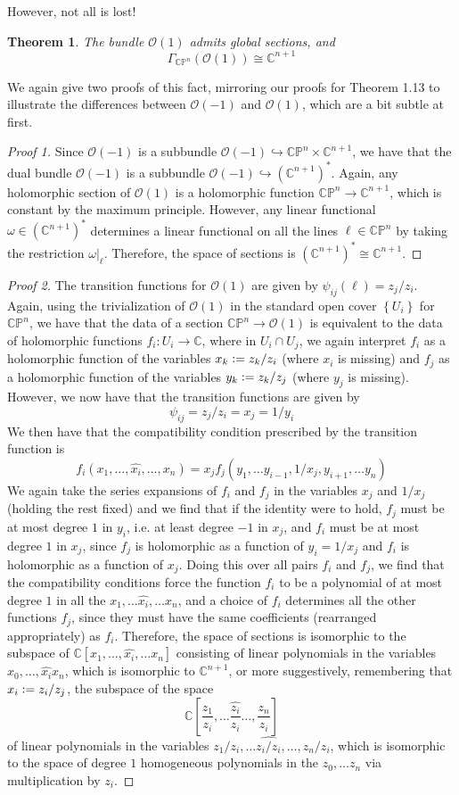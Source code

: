 \documentclass[psamsfonts, 12pt]{amsart}
\newtheorem{thm}{Theorem}[section]
\theoremstyle{definition}
\theoremstyle{remark}
\renewcommand{\O}{\mathscr{O}}
\newcommand{\C}{\mathbb{C}}
\newcommand{\CP}{\mathbb{CP}}
\newcommand{\set}[1]{\left\lbrace #1 \right\rbrace}
\newcommand{\defeq}{\vcentcolon=}
\begin{document}
%
However, not all is lost!
%
\begin{thm}
The bundle $\O(1)$ admits global sections, and
\[
\Gamma_{\CP^n}(\O(1)) \cong \C^{n+1}
\]
\end{thm}
%
We again give two proofs of this fact, mirroring our proofs for Theorem 1.13 to
illustrate the differences between $\O(-1)$ and $\O(1)$, which are a bit subtle at
first.
%
\begin{proof}[Proof 1]
Since $\O(-1)$ is a subbundle $\O(-1) \hookrightarrow \CP^n \times \C^{n+1}$, we
have that the dual bundle $\O(-1)$ is a subbundle $\O(-1) \hookrightarrow (\C^{n+1})^*$.
Again, any holomorphic section of $\O(1)$ is a holomorphic function
$\CP^n \to \C^{n+1}$, which is constant by the maximum principle. However, any
linear functional $\omega \in (\C^{n+1})^*$ determines a linear functional on
all the lines $\ell \in \CP^n$ by taking the restriction $\omega|_\ell$. Therefore,
the space of sections is $(\C^{n+1})^* \cong \C^{n+1}$.
\end{proof}
%
\begin{proof}[Proof 2]
The transition functions for $\O(1)$ are given by $\psi_{ij}(\ell) = z_j/z_i$. Again,
using the trivialization of $\O(1)$ in the standard open cover $\set{U_i}$ for
$\CP^n$, we have that the data of a section $\CP^n \to \O(1)$ is equivalent to
the data of holomorphic functions $f_i : U_i \to \C$, where in $U_i \cap U_j$, we again
interpret $f_i$ as a holomorphic function of the variables  $x_k \defeq z_k/z_i$
(where $x_i$ is missing) and $f_j$ as a holomorphic function of the variables
$y_k \defeq z_k/z_j$ (where $y_j$ is missing). However, we now have that the transition
functions are given by
\[
\psi_{ij} = z_j/z_i = x_j = 1/y_i
\]
We then have that the compatibility condition prescribed by the transition function
is
\[
f_i(x_1,\ldots,\widehat{x_i},\ldots, x_n) =
x_jf_j(y_1,\ldots y_{i-1}, 1/x_j, y_{i+1}, \ldots y_n)
\]
We again take the series expansions of $f_i$ and $f_j$ in the variables $x_j$
and $1/x_j$ (holding the rest fixed)  and we find that if the identity were to hold,
$f_j$ must be at most degree $1$ in $y_i$, i.e. at least degree $-1$ in $x_j$,
and $f_i$ must be at most degree $1$ in $x_j$, since $f_j$ is holomorphic as a function
of $y_i = 1/x_j$ and $f_i$ is holomorphic as a function of $x_j$. Doing this over
all pairs $f_i$ and $f_j$, we find that the compatibility conditions force the
function $f_i$ to be a polynomial of at most degree $1$ in all the
$x_1, \ldots \widehat{x_i}, \ldots x_n$, and a choice of $f_i$ determines all the other
functions $f_j$, since they must have the same coefficients (rearranged appropriately)
as $f_i$. Therefore, the space of sections is isomorphic to the subspace of
$\C[x_1,\ldots,\widehat{x_i},\ldots x_n]$ consisting of linear polynomials in the
variables $x_0, \ldots, \widehat{x_i} x_n$, which is isomorphic to $\C^{n+1}$, or more
suggestively, remembering that $x_i \defeq z_i/z_j$,  the subspace of the space
\[
\C\left[\frac{z_1}{z_i},\ldots \widehat{\frac{z_i}{z_i}}\ldots,\frac{z_n}{z_i}\right]
\]
of linear polynomials in the variables $z_1/z_i,\ldots \widehat{z_i/z_i},\ldots ,z_n/z_i$,
which is isomorphic to the space of degree $1$ homogeneous polynomials in the
$z_0,\ldots z_n$ via multiplication by $z_i$.
\end{proof}
\end{document}
